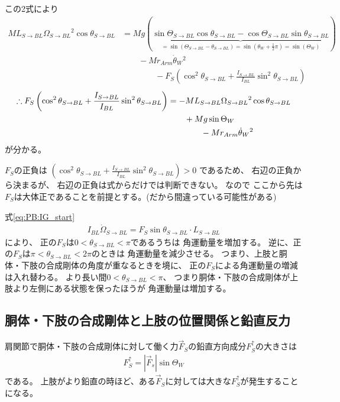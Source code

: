\documentclass[a4paper,11pt]{jsarticle}
\begin{document}
この2式により
\begin{align*}
  ML_{S\rightarrow BL}\Omega_{S\rightarrow BL}{}^2 \cos\theta_{S\rightarrow BL} 
  &= Mg\left(
    \underbrace{
      \sin\Theta_{S\rightarrow BL} \cos\theta_{S\rightarrow BL} - \cos\Theta_{S\rightarrow BL} \sin\theta_{S\rightarrow BL}
    }_{
      =\sin(\Theta_{S\rightarrow BL} - \theta_{S\rightarrow BL})=\sin(\theta_W+\frac{1}{2}\pi)=\sin(\Theta_W)
    }
  \right)
  \\
  & \qquad - Mr_{Arm}\dot{\theta}_W{}^2
  \\
  & \qquad \qquad - F_S\left( \cos^2\theta_{S\rightarrow BL} + \frac{I_{S\rightarrow BL}}{I_{BL}}\sin^2\theta_{S\rightarrow BL} \right)
\end{align*}
\begin{align}
  \therefore
  F_S
  \left( \cos^2\theta_{S\rightarrow BL} + \frac{I_{S\rightarrow BL}}{I_{BL}}\sin^2\theta_{S\rightarrow BL} \right)
  & = -ML_{S\rightarrow BL}\Omega_{S\rightarrow BL}{}^2 \cos\theta_{S\rightarrow BL} 
  \notag
  \\
  & \qquad + Mg \sin\Theta_W
  \notag
  \\
  & \qquad \qquad - Mr_{Arm}\dot{\theta}_W{}^2
  \label{eq:PB:FS_end}
\end{align}
が分かる。

$F_S$の正負は
$\left( \cos^2\theta_{S\rightarrow BL} + \frac{I_{S\rightarrow BL}}{I_{BL}}\sin^2\theta_{S\rightarrow BL} \right) > 0$
であるため、
右辺の正負から決まるが、
右辺の正負は式からだけでは判断できない。
なので
ここから先は
$F_S$は大体正であることを前提とする。(だから間違っている可能性がある)

式\ref{eq:PB:IG_start}
\begin{align*}
  I_{BL}\dot\Omega_{S\rightarrow BL}{} = F_S \sin\theta_{S\rightarrow BL} \cdot L_{S\rightarrow BL}
\end{align*}
により、
正の$F_S$は$0 < \theta_{S\rightarrow BL} < \pi$であるうちは
角運動量を増加する。
逆に、正の$F_S$は$\pi < \theta_{S\rightarrow BL} < 2\pi$のときは
角運動量を減少させる。
つまり、上肢と胴体・下肢の合成剛体の角度が重なるときを境に、
正の$F_S$による角運動量の増減は入れ替わる。
より長い間$0 < \theta_{S\rightarrow BL} < \pi$、
つまり胴体・下肢の合成剛体が上肢より左側にある状態を保ったほうが
角運動量は増加する。

\subsection{胴体・下肢の合成剛体と上肢の位置関係と鉛直反力}
肩関節で胴体・下肢の合成剛体に対して働く力$\vec{F}_S$の鉛直方向成分$F_{S}^\uparrow$の大きさは
\begin{align*}
  F_{S}^\uparrow = \left|\vec{F}_s\right|\sin\Theta_W
\end{align*}
である。
上肢がより鉛直の時ほど、ある$\vec{F}_S$に対しては大きな$F_{S}^\uparrow$が発生することになる。
\end{document}

